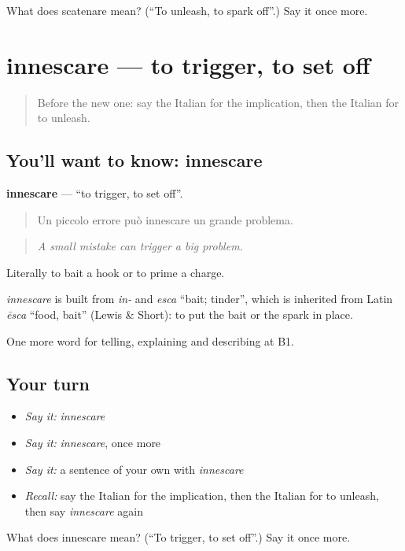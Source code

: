 \begin{tcolorbox}[breakable,colback=teal!4,colframe=teal!35!black,title={Before you move on}]
What does scatenare mean? (\textquotedblleft{}To unleash, to spark off\textquotedblright{}.) Say it once more.
\end{tcolorbox}
\section[innescare]{innescare — to trigger, to set off}

\label{lesson:IT-C352-innescare}



\begin{quote}
Before the new one: say the Italian for the implication, then the Italian for to unleash.
\end{quote}

\subsection*{You'll want to know: innescare}
\textbf{innescare} — \textquotedblleft{}to trigger, to set off\textquotedblright{}.

\begin{quote}
Un piccolo errore può innescare un grande problema.
\end{quote}

\begin{quote}
\emph{A small mistake can trigger a big problem.}
\end{quote}

Literally to bait a hook or to prime a charge.

\begin{cousinweb}
\emph{innescare} is built from \emph{in-} and \emph{esca} \textquotedblleft{}bait; tinder\textquotedblright{}, which is inherited from Latin \emph{ēsca} \textquotedblleft{}food, bait\textquotedblright{} (Lewis \& Short): to put the bait or the spark in place.
\end{cousinweb}

\begin{grammarlens}[title={What you've built}]
One more word for telling, explaining and describing at B1.
\end{grammarlens}

\subsection*{Your turn}
\begin{itemize}
\raggedright
  \item \emph{Say it:} \emph{innescare}
  \item \emph{Say it:} \emph{innescare}, once more
  \item \emph{Say it:} a sentence of your own with \emph{innescare}
  \item \emph{Recall:} say the Italian for the implication, then the Italian for to unleash, then say \emph{innescare} again
\end{itemize}

\begin{tcolorbox}[breakable,colback=teal!4,colframe=teal!35!black,title={Before you move on}]
What does innescare mean? (\textquotedblleft{}To trigger, to set off\textquotedblright{}.) Say it once more.
\end{tcolorbox}
